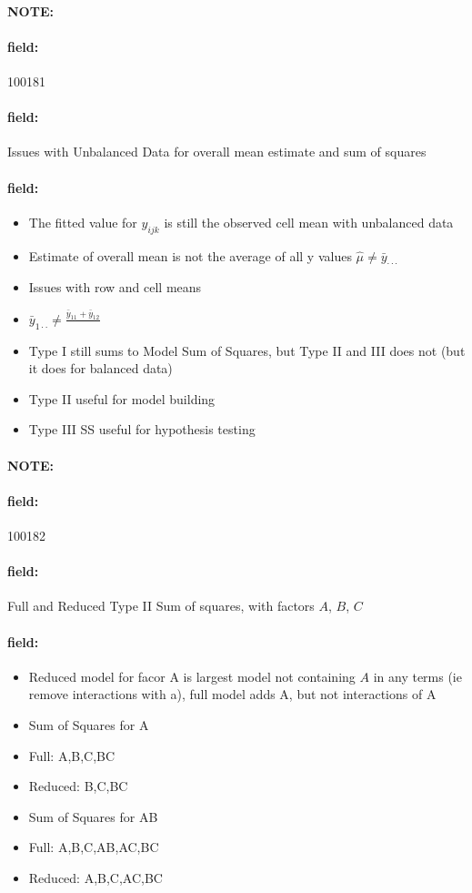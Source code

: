 \documentclass[12pt]{article}
\newenvironment{note}{\paragraph{NOTE:}}{}
\newenvironment{field}{\paragraph{field:}}{}
\begin{document}
\begin{note}
    \begin{field}
        \tiny 100181
    \end{field}
    \begin{field}
        Issues with Unbalanced Data for overall mean estimate and sum of squares
    \end{field}
    \begin{field}
        \begin{itemize}
          \item The fitted value for $y_{ijk}$ is still the observed cell mean with unbalanced data
          \item Estimate of overall mean is not the average of all y values $\hat{\mu} \neq \bar{y}_{\cdot \cdot \cdot }$
          \item Issues with row and cell means
          \item $\bar{y}_{1\cdot \cdot }\neq \frac{\bar{y}_{11}+ \bar{y}_{12}}{}$
          \item Type I still sums to Model Sum of Squares, but Type II and III does not (but it does for balanced data)
          \item Type II useful for model building
          \item Type III SS useful for hypothesis testing
        \end{itemize}
    \end{field}
\end{note}

\begin{note}
    \begin{field}
        \tiny 100182
    \end{field}
    \begin{field}
        Full and Reduced Type II Sum of squares, with factors $A$, $B$, $C$
    \end{field}
    \begin{field}
        \begin{itemize}
          \item Reduced model for facor A is largest model not containing $A$ in any terms (ie remove interactions with a), full model adds A, but not interactions of A
          \item Sum of Squares for A
          \item Full: A,B,C,BC
          \item Reduced: B,C,BC
          \item Sum of Squares for AB
          \item Full: A,B,C,AB,AC,BC
          \item Reduced: A,B,C,AC,BC
        \end{itemize}
    \end{field}
\end{note}
\end{document}
